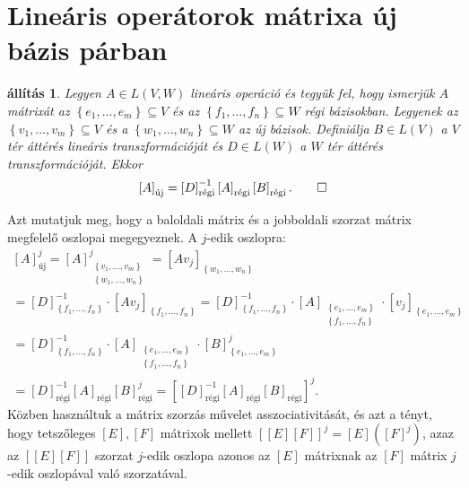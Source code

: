 \documentclass[9pt, a4paper, showtrims]{memoir}
\makeatletter
\renewenvironment{proof}[1][\proofname]
    {\par\pushQED{\qed}%
    \normalfont \topsep6\p@\@plus6\p@\relax
    \trivlist
    \item[\hskip\labelsep
        \itshape
    #1\@addpunct{:}]\ignorespaces}
    {\popQED\endtrivlist\@endpefalse}
\theoremstyle{plain}
\newtheorem{proposition}{állítás}[chapter]
\theoremstyle{remark}
\theoremstyle{definition}
\newcommand{\uj}{\text{új}}
\newcommand{\rgi}{\text{régi}}
\makeatother
\begin{document}
\section{Lineáris operátorok mátrixa új bázis párban}
\begin{proposition}
	Legyen $A\in L\left( V,W \right)$ lineáris operáció
	és tegyük fel, hogy ismerjük $A$ mátrixát az
	$\left\{ e_1,\ldots,e_m \right\}\subseteq V$ és az
	$\left\{ f_1,\ldots,f_n \right\}\subseteq W$ régi bázisokban.
	Legyenek az $\left\{ v_1,\ldots,v_m \right\}\subseteq V$
	és a $\left\{ w_1,\ldots,w_n \right\}\subseteq W$ az új bázisok.
	Definiálja $B\in L\left( V \right)$ a $V$ tér áttérés lineáris transzformációját
	és $D\in L\left( W \right)$ a $W$ tér áttérés transzformációját.
	Ekkor
	\[
		\left[ A \right]_{\uj}=
		\left[ D \right]_{\rgi}^{-1}\left[ A \right]_{\rgi}\left[ B \right]_{\rgi}.\qedhere
	\]
\end{proposition}
\begin{proof}
	Azt mutatjuk meg, hogy a baloldali mátrix és a jobboldali szorzat mátrix megfelelő oszlopai megegyeznek.
	A $j$-edik oszlopra:
	\begin{multline*}
		\left[ A \right]_{\uj}^j
		=
		\left[ A \right]_{\substack{\left\{ v_1,\ldots,v_m \right\}\\ \left\{ w_1,\ldots,w_n \right\}}}^j
		=
		\left[ Av_j \right]_{\left\{ w_1,\ldots,w_n \right\}}
		\\
		=
		\left[ D \right]^{-1}_{\left\{ f_1,\ldots,f_n \right\}}\cdot
		\left[ Av_j \right]_{\left\{ f_1,\ldots,f_n \right\}}
		=
		\left[ D \right]^{-1}_{\left\{ f_1,\ldots,f_n \right\}}\cdot
		\left[ A \right]_{\substack{\left\{ e_1,\ldots,e_m \right\}\\ \left\{ f_1,\ldots,f_n \right\}}}
		\cdot
		\left[ v_j \right]_{\left\{ e_1,\ldots,e_m \right\}}
		\\
		=
		\left[ D \right]^{-1}_{\left\{ f_1,\ldots,f_n \right\}}\cdot
		\left[ A \right]_{\substack{\left\{ e_1,\ldots,e_m \right\}\\ \left\{ f_1,\ldots,f_n \right\}}}
		\cdot
		\left[ B \right]_{\left\{ e_1,\ldots,e_m \right\}}^j
		\\
		=
		\left[ D \right]_\rgi^{-1}
		\left[ A \right]_\rgi
		\left[ B \right]_\rgi^j
		=
        \left[ \left[ D \right]^{-1}_\rgi\left[ A \right]_\rgi\left[ B \right]_\rgi \right]^j.
	\end{multline*}
	Közben használtuk a mátrix szorzás művelet asszociativitását,
	és azt a tényt,
	hogy tetszőleges $\left[ E \right],\left[ F \right]$ mátrixok mellett
    $\left[ \left[ E \right]\left[ F \right] \right]^j=\left[ E \right]\left( \left[F  \right]^j \right)$, azaz
    az $\left[ \left[ E \right]\left[ F \right] \right]$ szorzat $j$-edik oszlopa azonos az $\left[ E \right]$ mátrixnak az $\left[ F \right]$ mátrix $j$-edik oszlopával való szorzatával.
\end{proof}
\end{document}
